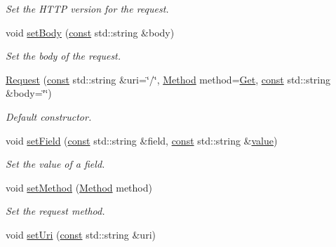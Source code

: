 \begin{DoxyCompactItemize}
\begin{DoxyCompactList}\small\item\em Set the H\-T\-T\-P version for the request. \end{DoxyCompactList}\item 
void \hyperlink{classsf_1_1_http_1_1_request_ae9f61ec3fa1639c70e9b5780cb35578e}{set\-Body} (\hyperlink{term__entry_8h_a57bd63ce7f9a353488880e3de6692d5a}{const} std\-::string \&body)
\begin{DoxyCompactList}\small\item\em Set the body of the request. \end{DoxyCompactList}\item 
\hyperlink{classsf_1_1_http_1_1_request_a8e89d9e8ffcc1163259b35d79809a61c}{Request} (\hyperlink{term__entry_8h_a57bd63ce7f9a353488880e3de6692d5a}{const} std\-::string \&uri=\char`\"{}/\char`\"{}, \hyperlink{classsf_1_1_http_1_1_request_a620f8bff6f43e1378f321bf53fbf5598}{Method} method=\hyperlink{classsf_1_1_http_1_1_request_a620f8bff6f43e1378f321bf53fbf5598a24d06852a988a57bbc05874f675ea34b}{Get}, \hyperlink{term__entry_8h_a57bd63ce7f9a353488880e3de6692d5a}{const} std\-::string \&body=\char`\"{}\char`\"{})
\begin{DoxyCompactList}\small\item\em Default constructor. \end{DoxyCompactList}\item 
void \hyperlink{classsf_1_1_http_1_1_request_aea672fae5dd089f4b6b3745ed46210d2}{set\-Field} (\hyperlink{term__entry_8h_a57bd63ce7f9a353488880e3de6692d5a}{const} std\-::string \&field, \hyperlink{term__entry_8h_a57bd63ce7f9a353488880e3de6692d5a}{const} std\-::string \&\hyperlink{curses_8priv_8h_a3772851912abe3ccbff5c659ff71f2ff}{value})
\begin{DoxyCompactList}\small\item\em Set the value of a field. \end{DoxyCompactList}\item 
void \hyperlink{classsf_1_1_http_1_1_request_abab148554e873e80d2e41376fde1cb62}{set\-Method} (\hyperlink{classsf_1_1_http_1_1_request_a620f8bff6f43e1378f321bf53fbf5598}{Method} method)
\begin{DoxyCompactList}\small\item\em Set the request method. \end{DoxyCompactList}\item 
void \hyperlink{classsf_1_1_http_1_1_request_a3723de4b4f1a14b744477841c4ac22e6}{set\-Uri} (\hyperlink{term__entry_8h_a57bd63ce7f9a353488880e3de6692d5a}{const} std\-::string \&uri)

\end{DoxyCompactItemize}
